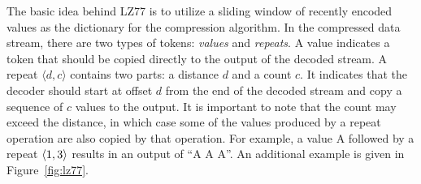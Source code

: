 
The basic idea behind LZ77 is to utilize a sliding window of recently
encoded values as the dictionary for the compression algorithm.  In
the compressed data stream, there are two types of tokens: {\it
  values} and {\it repeats}.  A value indicates a token that should be
copied directly to the output of the decoded stream.  A repeat
$\langle d, c \rangle$ contains two parts: a distance $d$ and a count
$c$.  It indicates that the decoder should start at offset $d$ from
the end of the decoded stream and copy a sequence of $c$ values to the
output.
It is important to note that the count may exceed the distance, in
which case some of the values produced by a repeat operation are also
copied by that operation.  For example, a value A followed by a repeat
$\langle1, 3\rangle$ results in an output of ``A A A''.  An additional example
is given in Figure~\ref{fig:lz77}.

